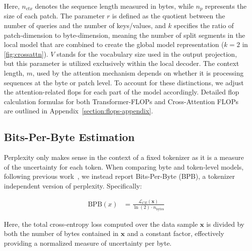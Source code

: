 Here, $n_{ctx}$ denotes the sequence length measured in bytes, while $n_p$ represents the size of each patch. The parameter $r$ is defined as the quotient between the number of queries and the number of keys/values, and $k$ specifies the ratio of patch-dimension to byte-dimension, meaning the number of split segments in the local model that are combined to create the global model representation ($k=2$ in \autoref{fig:crossattn}). $V$ stands for the vocabulary size used in the output projection, but this parameter is utilized exclusively within the local decoder. The context length, $m$, used by the attention mechanism depends on whether it is processing sequences at the byte or patch level. To account for these distinctions, we adjust the attention-related flops for each part of the model accordingly. Detailed flop calculation formulas for both Transformer-FLOPs and Cross-Attention FLOPs are outlined in Appendix~\ref{section:flops-appendix}.

\subsection{Bits-Per-Byte Estimation} Perplexity only makes sense in the context of a fixed tokenizer as it is a measure of the uncertainty for each token. When comparing byte and token-level models, following previous work~\citep{xue2022byt5, yu2023megabyte, wang2024mambabyte}, we instead report Bits-Per-Byte (BPB), a tokenizer independent version of perplexity. Specifically:

\begin{align}
    \text{BPB}(x)&= \frac{\mathcal{L}_{CE}(\pmb{x})}{\ln(2)\cdot n_{\text{bytes}}}
\end{align}

Here, the total cross-entropy loss computed over the data sample $\pmb{x}$ is divided by both the number of bytes contained in $\pmb{x}$ and a constant factor, effectively providing a normalized measure of uncertainty per byte.

